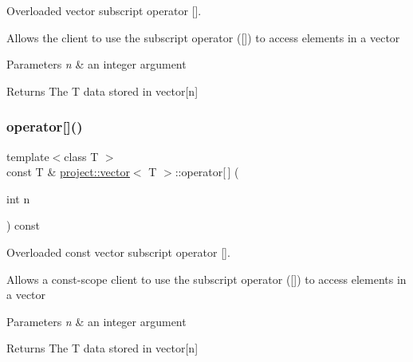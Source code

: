 Overloaded vector subscript operator \mbox{[}\mbox{]}. 

Allows the client to use the subscript operator (\mbox{[}\mbox{]}) to access elements in a vector 
\begin{DoxyParams}{Parameters}
{\em n} & an integer argument \\
\hline
\end{DoxyParams}
\begin{DoxyReturn}{Returns}
The T data stored in vector\mbox{[}n\mbox{]} 
\end{DoxyReturn}
\mbox{\label{classproject_1_1vector_ab75b6014a2b266c0b5e13b64efebcf7e}} 
\subsubsection{\texorpdfstring{operator[]()}{operator[]()}\hspace{0.1cm}{\footnotesize\ttfamily [2/2]}}
{\footnotesize\ttfamily template$<$class T $>$ \\
const T \& \mbox{\hyperlink{classproject_1_1vector}{project\+::vector}}$<$ T $>$\+::operator\mbox{[}$\,$\mbox{]} (\begin{DoxyParamCaption}\item[{int}]{n }\end{DoxyParamCaption}) const\hspace{0.3cm}{\ttfamily [inline]}}



Overloaded const vector subscript operator \mbox{[}\mbox{]}. 

Allows a const-\/scope client to use the subscript operator (\mbox{[}\mbox{]}) to access elements in a vector 
\begin{DoxyParams}{Parameters}
{\em n} & an integer argument \\
\hline
\end{DoxyParams}
\begin{DoxyReturn}{Returns}
The T data stored in vector\mbox{[}n\mbox{]} 
\end{DoxyReturn}
\mbox{\label{classproject_1_1vector_a0663a56a33c99d3117ab2361f8544507}} 
